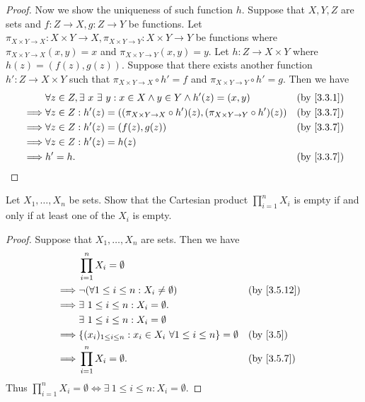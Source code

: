 \begin{proof}
  Now we show the uniqueness of such function \(h\).
  Suppose that \(X, Y, Z\) are sets and \(f : Z \to X, g : Z \to Y\) be functions.
  Let \(\pi_{X \times Y \to X} : X \times Y \to X, \pi_{X \times Y \to Y} : X \times Y \to Y\) be functions where \(\pi_{X \times Y \to X}(x, y) = x\) and \(\pi_{X \times Y \to Y}(x, y) = y\).
  Let \(h : Z \to X \times Y\) where \(h(z) = (f(z), g(z))\).
  Suppose that there exists another function \(h' : Z \to X \times Y\) such that \(\pi_{X \times Y \to X} \circ h' = f\) and \(\pi_{X \times Y \to Y} \circ h' = g\).
  Then we have
  \begin{align*}
             & \forall z \in Z, \exists\ x \ \exists\ y : x \in X \land y \in Y \land h'(z) = (x, y)                  &  & \by{3.3.1} \\
    \implies & \forall z \in Z : h'(z) = ((\pi_{X \times Y \to X} \circ h')(z), (\pi_{X \times Y \to Y} \circ h')(z)) &  & \by{3.3.7} \\
    \implies & \forall z \in Z : h'(z) = (f(z), g(z))                                                                 &  & \by{3.3.7} \\
    \implies & \forall z \in Z : h'(z) = h(z)                                                                                         \\
    \implies & h' = h.                                                                                                &  & \by{3.3.7}
  \end{align*}
\end{proof}

\begin{ex}\label{ex:3.5.8}
  Let \(X_1, \dots, X_n\) be sets.
  Show that the Cartesian product \(\prod_{i = 1}^n X_i\) is empty if and only if at least one of the \(X_i\) is empty.
\end{ex}

\begin{proof}
  Suppose that \(X_1, \dots, X_n\) are sets.
  Then we have
  \begin{align*}
             & \prod_{i = 1}^n X_i = \emptyset                                                                                \\
    \implies & \lnot (\forall 1 \leq i \leq n : X_i \neq \emptyset)                            &  & \text{(by \cref{3.5.12})} \\
    \implies & \exists\ 1 \leq i \leq n : X_i = \emptyset.                                                                    \\
             & \exists\ 1 \leq i \leq n : X_i = \emptyset                                                                     \\
    \implies & \{(x_i)_{1 \leq i \leq n} : x_i \in X_i \ \forall 1 \leq i \leq n\} = \emptyset &  & \text{(by \cref{3.5})}    \\
    \implies & \prod_{i = 1}^n X_i = \emptyset.                                                &  & \by{3.5.7}
  \end{align*}
  Thus \(\prod_{i = 1}^n X_i = \emptyset \iff \exists\ 1 \leq i \leq n : X_i = \emptyset\).
\end{proof}


